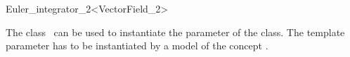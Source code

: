 
\begin{ccRefFunctionObjectClass}{Euler_integrator_2<VectorField_2>}  %

\ccDefinition
  
The class \ccRefName\ can be used to instantiate the  parameter of
the  class.
The template parameter  has to
be instantiated by a model of the concept .



\ccIsModel 

 \\


\ccSeeAlso
{} \\
\end{ccRefFunctionObjectClass}


